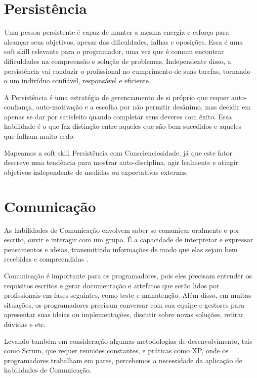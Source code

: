\section{Persistência}

Uma pessoa persistente é capaz de manter a mesma energia e esforço para alcançar seus objetivos, apesar das dificuldades, falhas e oposições. Essa é uma soft skill relevante para o programador, uma vez que é comum encontrar dificuldades na compreensão e solução de problemas. Independente disso, a persistência vai conduzir o profissional no cumprimento de suas tarefas, tornando-o um indivíduo confiável, responsável e  eficiente.

A Persistência é uma estratégia de gerenciamento de si próprio que requer auto-confiança, auto-motivação e a escolha por não permitir desânimo, mas decidir em apenas se dar por satisfeito quando completar seus deveres com êxito. Essa habilidade é o que faz distinção entre aqueles que são bem sucedidos e aqueles que falham muito cedo.

Mapeamos a soft skill Persistência com Conscienciosidade, já que este fator descreve uma tendência para mostrar auto-disciplina, agir lealmente e atingir objetivos independente de medidas ou expectativas externas.

\section{Comunicação}

As habilidades de Comunicação envolvem saber se comunicar oralmente e por escrito, ouvir e interagir com um grupo. É a capacidade de  interpretar e expressar pensamentos e ideias, transmitindo informações de modo que elas sejam bem recebidas e compreendidas \cite{ahmed:12}.

Comunicação é importante para os programadores, pois eles precisam entender os requisitos escritos e gerar documentação e artefatos que serão lidos por profissionais em fases seguintes, como teste e manutenção. Além disso, em muitas situações, os programadores precisam conversar com sua equipe e gestores para apresentar suas ideias ou implementações, discutir sobre novas soluções, retirar dúvidas e etc.

Levando também em consideração algumas metodologias de desenvolvimento, tais como Scrum, que requer reuniões constantes, e práticas como XP, onde os programadores trabalham em pares, percebemos a necessidade da aplicação de habilidades de Comunicação. 

